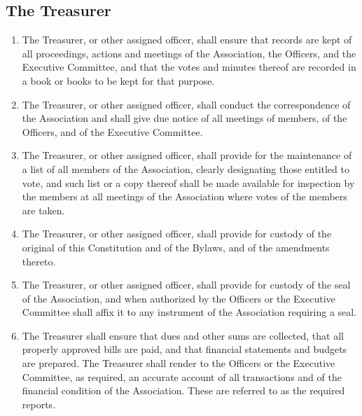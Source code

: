 \subsection{The Treasurer}
\begin{enumerate}
	\item The Treasurer, or other assigned officer, shall ensure that records are kept of all proceedings, actions and meetings of the Association, the Officers, and the Executive Committee, and that the votes and minutes thereof are recorded in a book or books to be kept for that purpose.
	\item The Treasurer, or other assigned officer, shall conduct the correspondence of the Association and shall give due notice of all meetings of members, of the Officers, and of the Executive Committee.
	\item The Treasurer, or other assigned officer, shall provide for the maintenance of a list of all members of the Association, clearly designating those entitled to vote, and such list or a copy thereof shall be made available for inspection by the members at all meetings of the Association where votes of the members are taken.
	\item The Treasurer, or other assigned officer, shall provide for custody of the original of this Constitution and of the Bylaws, and of the amendments thereto.
	\item The Treasurer, or other assigned officer, shall provide for custody of the seal of the Association, and when authorized by the Officers or the Executive Committee shall affix it to any instrument of the Association requiring a seal.
	\item The Treasurer shall ensure that dues and other sums are collected, that all properly approved bills are paid, and that financial statements and budgets are prepared. The Treasurer shall render to the Officers or the Executive Committee, as required, an accurate account of all transactions and of the financial condition of the Association. These are referred to as the required reports.
\end{enumerate}

